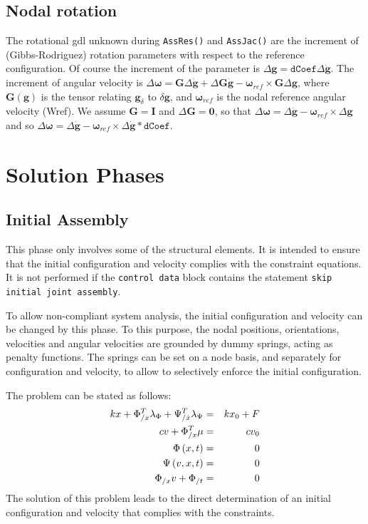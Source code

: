 \documentclass[10pt,dvips]{report}
\newcommand{\T}[1]{\boldsymbol{#1}}
\begin{document}
\section{Nodal rotation}
The rotational gdl unknown during \texttt{AssRes()} and \texttt{AssJac()}
are the increment of (Gibbs-Rodriguez) rotation parameters
with respect to the reference configuration.
Of course the increment of the parameter is
$\Delta \T g=\texttt{dCoef}\Delta \dot{\T g}$.
The increment of angular velocity is 
$\Delta \T \omega = \T G\Delta \dot{\T g}+ \Delta \T G \dot{\T g}-
\T \omega_{ref}\times \T G \Delta \T g$,
where $\T G(\T g)$ is the tensor relating $\T g_\delta$ to $\delta \T g$,
and $\T \omega_{ref}$ is the nodal reference angular velocity (Wref).
We assume $\T G = \T I$ and $\Delta \T G = \T 0$,
so that $\Delta \T \omega = \Delta \dot{\T g}-\T \omega_{ref}\times\Delta \T g$
and so $\Delta \T \omega = \Delta \dot{\T g}-
\T \omega_{ref}\times\Delta \dot{\T g} * \texttt{dCoef}$.


\chapter{Solution Phases}
\section{Initial Assembly}
This phase only involves some of the structural elements.
It is intended to ensure that the initial configuration and velocity 
complies with the constraint equations.
It is not performed if the \texttt{control data} block contains 
the statement \texttt{skip initial joint assembly}.

To allow non-compliant system analysis, the initial configuration 
and velocity can be changed by this phase.
To this purpose, the nodal positions, orientations, velocities
and angular velocities are grounded by dummy springs, acting 
as penalty functions.
The springs can be set on a node basis, and separately 
for configuration and velocity, to allow to selectively enforce 
the initial configuration.

The problem can be stated as follows:
\begin{eqnarray*}
	k x + \Phi_{/x}^T \lambda_{\Phi} + \Psi_{/\dot{x}}^T \lambda_{\Psi}
		& = & k x_0 + F \\
	c v + \Phi_{/x}^T \mu & = & c v_0 \\
	\Phi\left( x, t \right) & = & 0 \\
	\Psi\left( v, x, t \right) & = & 0 \\
	\Phi_{/x} v + \Phi_{/t} & = & 0
\end{eqnarray*}
The solution of this problem leads to the direct determination
of an initial configuration and velocity that complies 
with the constraints.
\end{document}
